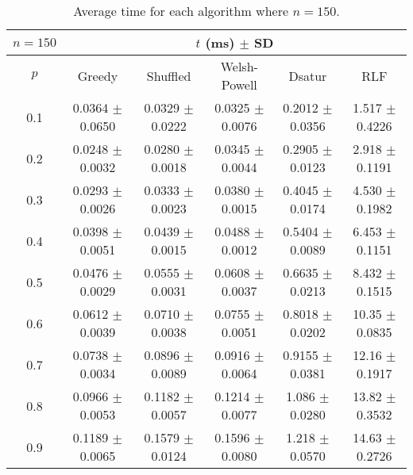 \begin{table}[H]
    \centering
    \begin{tabular}{cccccc}
        
        $n = 150$& \multicolumn{5}{c}{$t$ (\unit{ms}) $\pm$ SD} \\
        \hline
        $p$ & Greedy & Shuffled & Welsh-Powell & Dsatur & RLF \\
        \hline
        0.1 & 0.0364 $\pm$ 0.0650 & 0.0329 $\pm$ 0.0222 & 0.0325 $\pm$ 0.0076 & 0.2012 $\pm$ 0.0356 & 1.517 $\pm$ 0.4226 \\
        0.2 & 0.0248 $\pm$ 0.0032 & 0.0280 $\pm$ 0.0018 & 0.0345 $\pm$ 0.0044 & 0.2905 $\pm$ 0.0123 & 2.918 $\pm$ 0.1191 \\
        0.3 & 0.0293 $\pm$ 0.0026 & 0.0333 $\pm$ 0.0023 & 0.0380 $\pm$ 0.0015 & 0.4045 $\pm$ 0.0174 & 4.530 $\pm$ 0.1982 \\
        0.4 & 0.0398 $\pm$ 0.0051 & 0.0439 $\pm$ 0.0015 & 0.0488 $\pm$ 0.0012 & 0.5404 $\pm$ 0.0089 & 6.453 $\pm$ 0.1151 \\
        0.5 & 0.0476 $\pm$ 0.0029 & 0.0555 $\pm$ 0.0031 & 0.0608 $\pm$ 0.0037 & 0.6635 $\pm$ 0.0213 & 8.432 $\pm$ 0.1515 \\
        0.6 & 0.0612 $\pm$ 0.0039 & 0.0710 $\pm$ 0.0038 & 0.0755 $\pm$ 0.0051 & 0.8018 $\pm$ 0.0202 & 10.35 $\pm$ 0.0835 \\
        0.7 & 0.0738 $\pm$ 0.0034 & 0.0896 $\pm$ 0.0089 & 0.0916 $\pm$ 0.0064 & 0.9155 $\pm$ 0.0381 & 12.16 $\pm$ 0.1917 \\
        0.8 & 0.0966 $\pm$ 0.0053 & 0.1182 $\pm$ 0.0057 & 0.1214 $\pm$ 0.0077 & 1.086 $\pm$ 0.0280 & 13.82 $\pm$ 0.3532 \\
        0.9 & 0.1189 $\pm$ 0.0065 & 0.1579 $\pm$ 0.0124 & 0.1596 $\pm$ 0.0080 & 1.218 $\pm$ 0.0570 & 14.63 $\pm$ 0.2726 \\
        \hline
    \end{tabular}
    \caption{Average time for each algorithm where $n = 150$.}
    \label{tab:avgTimeforV150}
\end{table}

